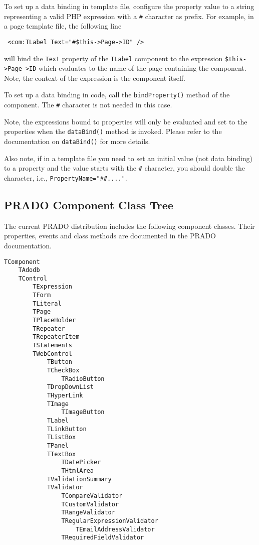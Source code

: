 \documentclass{book}
\begin{document}
To set up a data binding in template file, configure the property
value to a string representing a valid PHP expression with a
\verb|#| character as prefix. For example, in a page template
file, the following line
\begin{verbatim}
 <com:TLabel Text="#$this->Page->ID" />
\end{verbatim}
will bind the \verb|Text| property of the \verb|TLabel| component
to the expression \verb|$this->Page->ID| which evaluates to the
name of the page containing the component. Note, the context of
the expression is the component itself.


To set up a data binding in code, call the \verb|bindProperty()|
method of the component. The \verb|#| character is not needed in
this case.


Note, the expressions bound to properties will only be evaluated
and set to the properties when the \verb|dataBind()| method is
invoked. Please refer to the documentation on \verb|dataBind()|
for more details.


Also note, if in a template file you need to set an initial value
(not data binding) to a property and the value starts with the
\verb|#| character, you should double the character, i.e.,
\verb|PropertyName="##...."|.


\subsection{PRADO Component Class Tree}

The current PRADO distribution includes the following component
classes. Their properties, events  and class methods are
documented in the PRADO documentation.
\begin{verbatim}
TComponent
    TAdodb
    TControl
        TExpression
        TForm
        TLiteral
        TPage
        TPlaceHolder
        TRepeater
        TRepeaterItem
        TStatements
        TWebControl
            TButton
            TCheckBox
                TRadioButton
            TDropDownList
            THyperLink
            TImage
                TImageButton
            TLabel
            TLinkButton
            TListBox
            TPanel
            TTextBox
                TDatePicker
                THtmlArea
            TValidationSummary
            TValidator
                TCompareValidator
                TCustomValidator
                TRangeValidator
                TRegularExpressionValidator
                    TEmailAddressValidator
                TRequiredFieldValidator
\end{verbatim}
\end{document}
